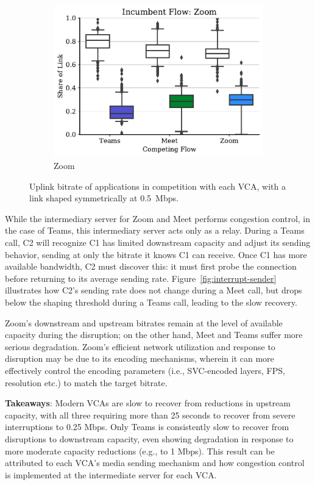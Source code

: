 \begin{figure}[t!]
\begin{subfigure}[t]{.33\textwidth}
        \includegraphics[width=1\textwidth]{figures/comp_all/box_plot_zoom_ul_0.5_all.pdf}
        \caption{Zoom}
        \label{fig:zoom_ul_box}
    \end{subfigure}
    \caption{Uplink bitrate of applications in competition with each VCA, with a link shaped symmetrically at 0.5~Mbps.}
    \label{fig:boxplot-upld}
\end{figure}

While the intermediary server for Zoom and Meet performs congestion control,
in the case of Teams, this intermediary server acts only as a relay. During a
Teams call, C2 will recognize C1 has limited downstream capacity and adjust
its sending behavior, sending at only the bitrate it knows C1 can receive.
Once C1 has more available bandwidth, C2 must discover this: it must first
probe the connection before returning to its average sending rate.
Figure~\ref{fig:interrupt-sender} illustrates how C2's sending rate does not
change during a Meet call, but drops below the shaping threshold during a
Teams call, leading to the slow recovery.

Zoom's downstream and upstream bitrates remain at the level of available
capacity during the disruption; on the other hand, Meet and Teams suffer more
serious degradation. Zoom's efficient network utilization and response to
disruption may be due to its encoding mechanisms, wherein it can more
effectively control the encoding parameters (i.e., SVC-encoded layers, FPS,
resolution etc.) to match the target bitrate.  

\begin{mdframed}[roundcorner=5pt, backgroundcolor=black!10] \noindent
    \textbf{Takeaways}: Modern VCAs are slow to recover from reductions in upstream 
    capacity, with all three requiring more than 25 seconds to recover from severe
    interruptions to 0.25 Mbps. Only Teams is consistently slow to recover
    from disruptions to downstream capacity, even showing degradation in
    response to more moderate capacity reductions (e.g., to 1 Mbps).
    This result can be attributed to each VCA's media sending mechanism and how
    congestion control is implemented at the intermediate server for each VCA. 
\end{mdframed}


